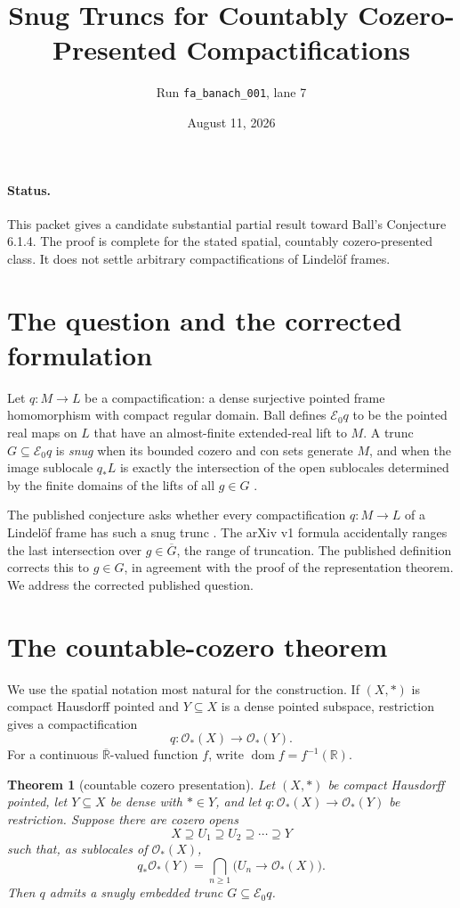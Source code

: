 \documentclass[11pt]{article}
\title{Snug Truncs for Countably Cozero-Presented Compactifications}
\author{Run \texttt{fa\_banach\_001}, lane 7}
\date{August 11, 2026}
\newtheorem{theorem}{Theorem}
\newcommand{\R}{\mathbb{R}}
\newcommand{\eR}{\overline{\mathbb{R}}}
\newcommand{\cO}{\mathcal{O}}
\newcommand{\E}{\mathcal{E}}
\begin{document}
\maketitle

\paragraph{Status.}
This packet gives a candidate substantial partial result toward Ball's
Conjecture 6.1.4.  The proof is complete for the stated spatial,
countably cozero-presented class.  It does not settle arbitrary
compactifications of Lindel\"of frames.

\section{The question and the corrected formulation}

Let \(q:M\to L\) be a compactification: a dense surjective pointed frame
homomorphism with compact regular domain.  Ball defines \(\E_0q\) to be the
pointed real maps on \(L\) that have an almost-finite extended-real lift to
\(M\).  A trunc \(G\subseteq\E_0q\) is \emph{snug} when its bounded cozero and
con sets generate \(M\), and when the image sublocale \(q_*L\) is exactly the
intersection of the open sublocales determined by the finite domains of the
lifts of all \(g\in G\) \cite[Definition preceding Theorem 3.3.2]{Ball2021}.

The published conjecture asks whether every compactification \(q:M\to L\) of
a Lindel\"of frame has such a snug trunc \cite[Conjecture 6.1.4]{Ball2021}.
The arXiv v1 formula accidentally ranges the last intersection over
\(g\in\overline G\), the range of truncation.  The published definition
corrects this to \(g\in G\), in agreement with the proof of the representation
theorem.  We address the corrected published question.

\section{The countable-cozero theorem}

We use the spatial notation most natural for the construction.  If
\((X,*)\) is compact Hausdorff pointed and \(Y\subseteq X\) is a dense
pointed subspace, restriction gives a compactification
\[
 q:\cO_*(X)\longrightarrow\cO_*(Y).
\]
For a continuous \(\eR\)-valued function \(f\), write
\(\operatorname{dom}f=f^{-1}(\R)\).

\begin{theorem}[countable cozero presentation]\label{thm:main}
Let \((X,*)\) be compact Hausdorff pointed, let \(Y\subseteq X\) be dense
with \(*\in Y\), and let \(q:\cO_*(X)\to\cO_*(Y)\) be restriction.  Suppose
there are cozero opens
\[
 X\supseteq U_1\supseteq U_2\supseteq\cdots\supseteq Y
\]
such that, as sublocales of \(\cO_*(X)\),
\[
 q_*\cO_*(Y)=\bigcap_{n\geq1}\bigl(U_n\to\cO_*(X)\bigr).
\]
Then \(q\) admits a snugly embedded trunc \(G\subseteq\E_0q\).
\end{theorem}
\end{document}
